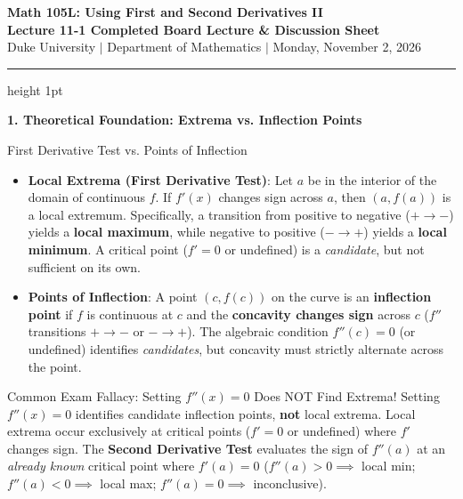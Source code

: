 \documentclass[11pt]{article}
\begin{document}
\begin{center}
  {\fontsize{15}{18}\selectfont \textbf{\textcolor{dukeNavy}{Math 105L: Using First and Second Derivatives II}}}\\[2pt]
  {\normalsize \textbf{Lecture 11-1 Completed Board Lecture \& Discussion Sheet}}\\[1pt]
  {\footnotesize \textcolor{gray!80!black}{Duke University \quad $\vert$ \quad Department of Mathematics \quad $\vert$ \quad Monday, November 2, 2026}}
\end{center}
\vspace{-7pt}
{\color{dukeNavy}\hrule height 1pt}
\vspace{4pt}

\textbf{\normalsize \textcolor{dukeNavy}{1. Theoretical Foundation: Extrema vs. Inflection Points}}
\vspace{1pt}

\begin{calloutbox}{First Derivative Test vs. Points of Inflection}
\begin{itemize}[leftmargin=1.2em, itemsep=1pt, topsep=1pt]
  \item \textbf{Local Extrema (First Derivative Test)}: Let $a$ be in the interior of the domain of continuous $f$. If $f'(x)$ changes sign across $a$, then $(a, f(a))$ is a local extremum. Specifically, a transition from positive to negative ($+\to-$) yields a \textcolor{dukeBlue}{\textbf{local maximum}}, while negative to positive ($-\to+$) yields a \textcolor{dukeBlue}{\textbf{local minimum}}. A critical point ($f'=0$ or undefined) is a \textit{candidate}, but not sufficient on its own.
  \item \textbf{Points of Inflection}: A point $(c, f(c))$ on the curve is an \textcolor{accentRed}{\textbf{inflection point}} if $f$ is continuous at $c$ and the \textbf{concavity changes sign} across $c$ ($f''$ transitions $+\to-$ or $-\to+$). The algebraic condition $f''(c) = 0$ (or undefined) identifies \textit{candidates}, but concavity must strictly alternate across the point.
\end{itemize}
\end{calloutbox}

\vspace{1pt}
\begin{warnbox}{Common Exam Fallacy: Setting $f''(x) = 0$ Does NOT Find Extrema!}
Setting $f''(x) = 0$ identifies candidate inflection points, \textbf{not} local extrema. Local extrema occur exclusively at critical points ($f'=0$ or undefined) where $f'$ changes sign. The \textbf{Second Derivative Test} evaluates the sign of $f''(a)$ at an \textit{already known} critical point where $f'(a) = 0$ ($f''(a) > 0 \implies$ local min; $f''(a) < 0 \implies$ local max; $f''(a) = 0 \implies$ inconclusive).
\end{warnbox}
\end{document}
